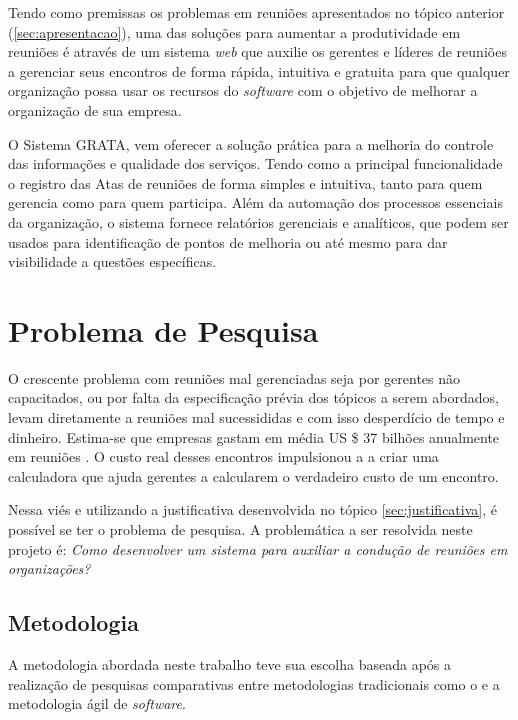 Tendo como premissas os problemas em reuniões apresentados no tópico anterior (\ref{sec:apresentacao}), uma das soluções para aumentar a produtividade em reuniões é através de um sistema \textit{web} que auxilie os gerentes e líderes de reuniões a gerenciar seus encontros de forma rápida, intuitiva e gratuita para que qualquer organização possa usar os recursos do \textit{software} com o objetivo de melhorar a organização de sua empresa.

O Sistema GRATA, vem oferecer a solução prática para a melhoria do controle das informações e qualidade dos serviços. Tendo como a principal funcionalidade o registro das Atas de reuniões de forma simples e intuitiva, tanto para quem gerencia como para quem participa. Além da automação dos processos essenciais da organização, o sistema fornece relatórios gerenciais e analíticos, que podem ser usados para identificação de pontos de melhoria ou até mesmo para dar visibilidade a questões específicas.

\section{Problema de Pesquisa}
\label{sec:problema_de_pesquisa}

O crescente problema com reuniões mal gerenciadas seja por gerentes não capacitados, ou por falta da especificação prévia dos tópicos a serem abordados, levam diretamente a reuniões mal sucessididas e com isso desperdício de tempo e dinheiro. Estima-se que empresas gastam em média US \$ 37 bilhões anualmente em reuniões \cite{baer}. O custo real desses encontros impulsionou a \cite{harvard} a criar uma calculadora que ajuda gerentes a calcularem o verdadeiro custo de um encontro.

Nessa viés e utilizando a justificativa desenvolvida no tópico \ref{sec:justificativa}, é possível se ter o problema de pesquisa. A problemática a ser resolvida neste projeto é: \textit{Como desenvolver um sistema para auxiliar a condução de reuniões em organizações?}

\subsection{Metodologia}
\label{sec:metodologia_introducao}

A metodologia abordada neste trabalho teve sua escolha baseada após a realização de pesquisas comparativas entre metodologias tradicionais como o \cite{pmbok} e a metodologia ágil de \textit{software}.

